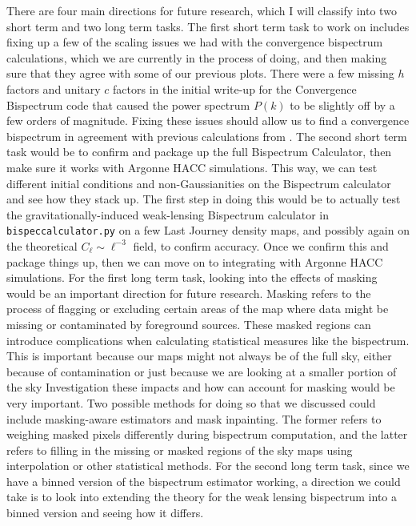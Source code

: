 \documentclass[11pt]{article}
\renewcommand{\_}[1]{\underline{ #1 }}
\newcommand{\npar}{\vspace{.3cm}\newline}
\newcommand{\us}{\textunderscore}
\begin{document}
{There are four main directions for future research, which I will classify into two short term and two long term tasks.
\npar
The first short term task to work on includes fixing up a few of the scaling issues we had with the convergence bispectrum calculations, which we are currently in the process of doing, and then making sure that they agree with some of our previous plots. There were a few missing $h$ factors and unitary $c$ factors in the initial write-up for the Convergence Bispectrum code that caused the power spectrum $P(k)$ to be slightly off by a few orders of magnitude. Fixing these issues should allow us to find a convergence bispectrum in agreement with previous calculations from \cite{Namikawa_2019}.
\npar
The second short term task would be to confirm and package up the full Bispectrum Calculator, then make sure it works with Argonne HACC simulations. This way, we can test different initial conditions and non-Gaussianities on the Bispectrum calculator and see how they stack up. The first step in doing this would be to actually test the gravitationally-induced weak-lensing Bispectrum calculator in \texttt{bispec\us calculator.py} on a few Last Journey density maps, and possibly again on the theoretical $C_{\ell} \sim \ell^{-3}$ field, to confirm accuracy. Once we confirm this and package things up, then we can move on to integrating with Argonne HACC simulations.
\npar
For the first long term task, looking into the effects of masking would be an important direction for future research. Masking refers to the process of flagging or excluding certain areas of the map where data might be missing or contaminated by foreground sources. These masked regions can introduce complications when calculating statistical measures like the bispectrum. This is important because our maps might not always be of the full sky, either because of contamination or just because we are looking at a smaller portion of the sky Investigation these impacts and how can account for masking would be very important. Two possible methods for doing so that we discussed could include masking-aware estimators and mask inpainting. The former refers to weighing masked pixels differently during bispectrum computation, and the latter refers to filling in the missing or masked regions of the sky maps using interpolation or other statistical methods.
\npar
For the second long term task, since we have a binned version of the bispectrum estimator working, a direction we could take is to look into extending the theory for the weak lensing bispectrum into a binned version and seeing how it differs.

}
\end{document}

